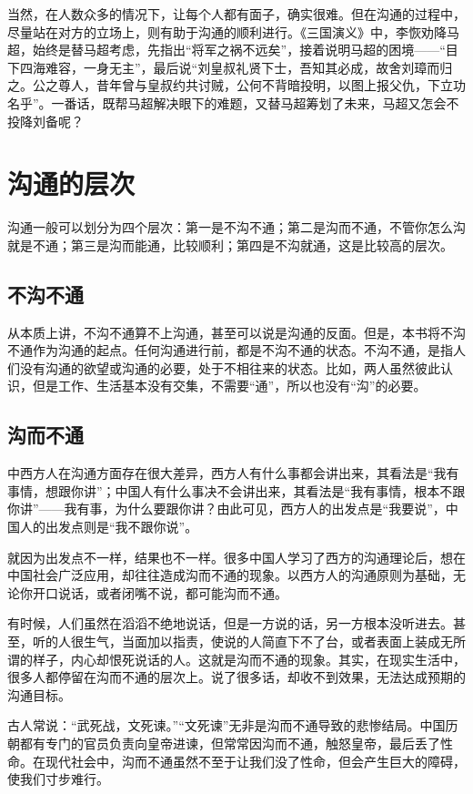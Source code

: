 \documentclass[fontset=fandol, a4paper, 12pt, openright]{ctexbook}
\begin{document}
当然，在人数众多的情况下，让每个人都有面子，确实很难。但在沟通的过程中，尽量站在对方的立场上，则有助于沟通的顺利进行。《三国演义》中，李恢劝降马超，始终是替马超考虑，先指出“将军之祸不远矣”，接着说明马超的困境——“目下四海难容，一身无主”，最后说“刘皇叔礼贤下士，吾知其必成，故舍刘璋而归之。公之尊人，昔年曾与皇叔约共讨贼，公何不背暗投明，以图上报父仇，下立功名乎”。一番话，既帮马超解决眼下的难题，又替马超筹划了未来，马超又怎会不投降刘备呢？


\chapter{沟通的层次}
沟通一般可以划分为四个层次：第一是不沟不通；第二是沟而不通，不管你怎么沟就是不通；第三是沟而能通，比较顺利；第四是不沟就通，这是比较高的层次。


\section{不沟不通}

从本质上讲，不沟不通算不上沟通，甚至可以说是沟通的反面。但是，本书将不沟不通作为沟通的起点。任何沟通进行前，都是不沟不通的状态。不沟不通，是指人们没有沟通的欲望或沟通的必要，处于不相往来的状态。比如，两人虽然彼此认识，但是工作、生活基本没有交集，不需要“通”，所以也没有“沟”的必要。


\section{沟而不通}

中西方人在沟通方面存在很大差异，西方人有什么事都会讲出来，其看法是“我有事情，想跟你讲”；中国人有什么事决不会讲出来，其看法是“我有事情，根本不跟你讲”——我有事，为什么要跟你讲？由此可见，西方人的出发点是“我要说”，中国人的出发点则是“我不跟你说”。

就因为出发点不一样，结果也不一样。很多中国人学习了西方的沟通理论后，想在中国社会广泛应用，却往往造成沟而不通的现象。以西方人的沟通原则为基础，无论你开口说话，或者闭嘴不说，都可能沟而不通。

有时候，人们虽然在滔滔不绝地说话，但是一方说的话，另一方根本没听进去。甚至，听的人很生气，当面加以指责，使说的人简直下不了台，或者表面上装成无所谓的样子，内心却恨死说话的人。这就是沟而不通的现象。其实，在现实生活中，很多人都停留在沟而不通的层次上。说了很多话，却收不到效果，无法达成预期的沟通目标。

古人常说：“武死战，文死谏。”“文死谏”无非是沟而不通导致的悲惨结局。中国历朝都有专门的官员负责向皇帝进谏，但常常因沟而不通，触怒皇帝，最后丢了性命。在现代社会中，沟而不通虽然不至于让我们没了性命，但会产生巨大的障碍，使我们寸步难行。
\end{document}
